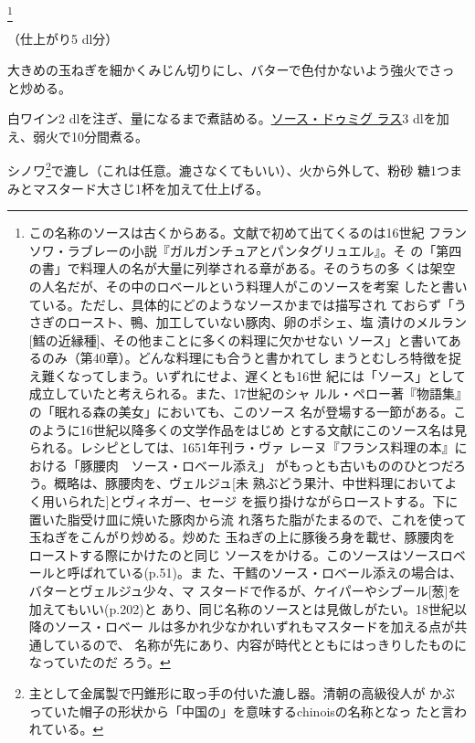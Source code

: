 \begin{recette}
\footnote{この名称のソースは古くからある。文献で初めて出てくるのは16世紀
  フランソワ・ラブレーの小説『ガルガンチュアとパンタグリュエル』。そ
  の「第四の書」で料理人の名が大量に列挙される章がある。そのうちの多
  くは架空の人名だが、その中のロベールという料理人がこのソースを考案
  したと書いている。ただし、具体的にどのようなソースかまでは描写され
  ておらず「うさぎのロースト、鴨、加工していない豚肉、卵のポシェ、塩
  漬けのメルラン{[}鱈の近縁種{]}、その他まことに多くの料理に欠かせない
  ソース」と書いてあるのみ（第40章）。どんな料理にも合うと書かれてし
  まうとむしろ特徴を捉え難くなってしまう。いずれにせよ、遅くとも16世
  紀には「ソース」として成立していたと考えられる。また、17世紀のシャ
  ルル・ペロー著『物語集』の「眠れる森の美女」においても、このソース
  名が登場する一節がある。このように16世紀以降多くの文学作品をはじめ
  とする文献にこのソース名は見られる。レシピとしては、1651年刊ラ・ヴァ
  レーヌ『フランス料理の本』における「豚腰肉　ソース・ロベール添え」
  がもっとも古いもののひとつだろう。概略は、豚腰肉を、ヴェルジュ{[}未
  熟ぶどう果汁、中世料理においてよく用いられた{]}とヴィネガー、セージ
  を振り掛けながらローストする。下に置いた脂受け皿に焼いた豚肉から流
  れ落ちた脂がたまるので、これを使って玉ねぎをこんがり炒める。炒めた
  玉ねぎの上に豚後ろ身を載せ、豚腰肉をローストする際にかけたのと同じ
  ソースをかける。このソースはソースロベールと呼ばれている(p.51)。ま
  た、干鱈のソース・ロベール添えの場合は、バターとヴェルジュ少々、マ
  スタードで作るが、ケイパーやシブール{[}葱{]}を加えてもいい(p.202)と
  あり、同じ名称のソースとは見做しがたい。18世紀以降のソース・ロベー
  ルは多かれ少なかれいずれもマスタードを加える点が共通しているので、
  名称が先にあり、内容が時代とともにはっきりしたものになっていたのだ
  ろう。}


（仕上がり5 dl分）

大きめの玉ねぎを細かくみじん切りにし、バターで色付かないよう強火でさっ
と炒める。

白ワイン2
dlを注ぎ、\untiers{}量になるまで煮詰める。\protect\hyperlink{sauce-demi-glace}{ソース・ドゥミグ
ラス}3 dlを加え、弱火で10分間煮る。

シノワ\footnote{主として金属製で円錐形に取っ手の付いた漉し器。清朝の高級役人が
  かぶっていた帽子の形状から「中国の」を意味するchinoisの名称となっ
  たと言われている。}で漉し（これは任意。漉さなくてもいい）、火から外して、粉砂
糖1つまみとマスタード大さじ1杯を加えて仕上げる。


\end{recette}
